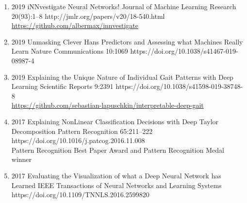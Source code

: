{\begin{enumerate}
    \item {}
                        {2019}
                        {iNNvestigate Neural Networks!}
                        {Journal of Machine Learning Research}
                        {20(93):1--8}
                        {http://jmlr.org/papers/v20/18-540.html}
                        {\\\href{https://github.com/albermax/innvestigate}{https://github.com/albermax/innvestigate}}

    \item {}
                        {2019}
                        {Unmasking Clever Hans Predictors and Assessing what Machines Really Learn}
                        {Nature Communications}
                        {10:1069}
                        {https://doi.org/10.1038/s41467-019-08987-4}

    \item {}
                        {2019}
                        {Explaining the Unique Nature of Individual Gait Patterns with Deep Learning}
                        {Scientific Reports}
                        {9:2391}
                        {https://doi.org/10.1038/s41598-019-38748-8}
                        {\\\href{https://github.com/sebastian-lapuschkin/interpretable-deep-gait}{https://github.com/sebastian-lapuschkin/interpretable-deep-gait}}

    \item {}
                            {2017}
                            {Explaining NonLinear Classification Decisions with Deep Taylor Decomposition}
                            {Pattern Recognition}
                            {65:211--222}
                            {https://doi.org/10.1016/j.patcog.2016.11.008}
                            {\\Pattern Recognition Best Paper Award and Pattern Recognition Medal winner}

    \item {}
                        {2017}
                        {Evaluating the Visualization of what a Deep Neural Network has Learned}
                        {IEEE Transactions of Neural Networks and Learning Systems}
                        {}
                        {https://doi.org/10.1109/TNNLS.2016.2599820}


\end{enumerate}}
